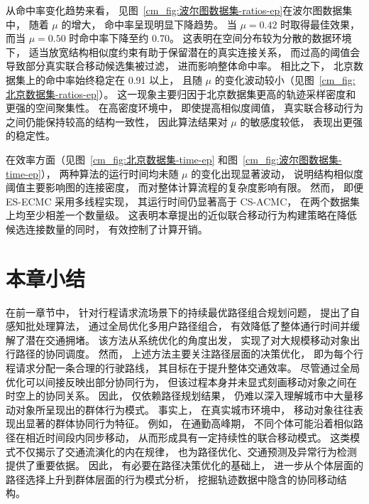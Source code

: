 从命中率变化趋势来看， 见图~\ref{cm_fig:波尔图数据集-ratios-ep}在波尔图数据集中， 随着 $\mu$ 的增大， 命中率呈现明显下降趋势。 当 $\mu=0.42$ 时取得最佳效果， 而当 $\mu=0.50$ 时命中率下降至约 0.70。 这表明在空间分布较为分散的数据环境下， 适当放宽结构相似度约束有助于保留潜在的真实连接关系， 而过高的阈值会导致部分真实联合移动候选集被过滤， 进而影响整体命中率。 相比之下， 北京数据集上的命中率始终稳定在 0.91 以上， 且随 $\mu$ 的变化波动较小（见图~\ref{cm_fig:北京数据集-ratios-ep}）。 这一现象主要归因于北京数据集更高的轨迹采样密度和更强的空间聚集性。 在高密度环境中， 即使提高相似度阈值， 真实联合移动行为之间仍能保持较高的结构一致性， 因此算法结果对 $\mu$ 的敏感度较低， 表现出更强的稳定性。

在效率方面（见图~\ref{cm_fig:北京数据集-time-ep} 和图~\ref{cm_fig:波尔图数据集-time-ep}）， 两种算法的运行时间均未随 $\mu$ 的变化出现显著波动， 说明结构相似度阈值主要影响图的连接密度， 而对整体计算流程的复杂度影响有限。 然而， 即便 ES-ECMC 采用多线程实现， 其运行时间仍显著高于 CS-ACMC， 在两个数据集上均至少相差一个数量级。 这表明本章提出的近似联合移动行为构建策略在降低候选连接数量的同时， 有效控制了计算开销。

\section{本章小结}
\label{cm_sec:conclusion}
在前一章节中， 针对行程请求流场景下的持续最优路径组合规划问题， 提出了自感知批处理算法， 通过全局优化多用户路径组合， 有效降低了整体通行时间并缓解了潜在交通拥堵。 该方法从系统优化的角度出发， 实现了对大规模移动对象出行路径的协同调度。 然而， 上述方法主要关注路径层面的决策优化， 即为每个行程请求分配一条合理的行驶路线， 其目标在于提升整体交通效率。 尽管通过全局优化可以间接反映出部分协同行为， 但该过程本身并未显式刻画移动对象之间在时空上的协同关系。 因此， 仅依赖路径规划结果， 仍难以深入理解城市中大量移动对象所呈现出的群体行为模式。 事实上， 在真实城市环境中， 移动对象往往表现出显著的群体协同行为特征。 例如， 在通勤高峰期， 不同个体可能沿着相似路径在相近时间段内同步移动， 从而形成具有一定持续性的联合移动模式。 这类模式不仅揭示了交通流演化的内在规律， 也为路径优化、交通预测及异常行为检测提供了重要依据。 因此， 有必要在路径决策优化的基础上， 进一步从个体层面的路径选择上升到群体层面的行为模式分析， 挖掘轨迹数据中隐含的协同移动结构。

